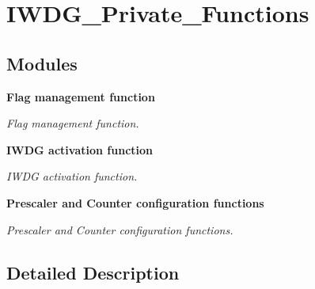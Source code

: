 \section{I\+W\+D\+G\+\_\+\+Private\+\_\+\+Functions}
\label{group__IWDG__Private__Functions}
\subsection*{Modules}
\begin{DoxyCompactItemize}
\item 
\textbf{ Flag management function}
\begin{DoxyCompactList}\small\item\em Flag management function. \end{DoxyCompactList}\item 
\textbf{ I\+W\+D\+G activation function}
\begin{DoxyCompactList}\small\item\em I\+W\+DG activation function. \end{DoxyCompactList}\item 
\textbf{ Prescaler and Counter configuration functions}
\begin{DoxyCompactList}\small\item\em Prescaler and Counter configuration functions. \end{DoxyCompactList}\end{DoxyCompactItemize}


\subsection{Detailed Description}
